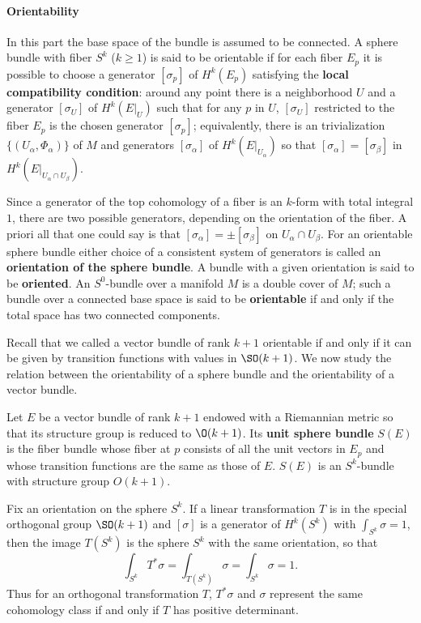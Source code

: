 \paragraph{Orientability}
In this part the base space of the bundle is assumed to be connected. A sphere bundle with fiber $S^k$ ($k\geq 1$) is said to be orientable if for each fiber $E_p$ it 
is possible to choose a generator $[\sigma_p]$ of $H^k(E_p)$ satisfying the \textbf{local compatibility condition}: around any point there is a neighborhood $U$ and a 
generator $[\sigma_U]$ of $H^k(E|_U)$ such that for any $p$ in $U$, $[\sigma_U]$ restricted to the fiber $E_p$ is the chosen generator $[\sigma_p]$; equivalently, 
there is an trivialization $\{(U_\alpha,\varPhi_\alpha)\}$ of $M$ and generators $[\sigma_\alpha]$ of $H^k(E|_{U_\alpha})$ so that $[\sigma_\alpha]=[\sigma_\beta]$ in 
$H^k(E|_{U_\alpha\cap U_\beta})$.\par
Since a generator of the top cohomology of a fiber is an $k$-form with total integral $1$, there are two possible generators, depending on the orientation of the fiber. 
A priori all that one could say is that $[\sigma_\alpha]=\pm[\sigma_\beta]$ on $U_\alpha\cap U_\beta$. For an orientable sphere bundle either choice of a consistent 
system of generators is called an \textbf{orientation of the sphere bundle}. A bundle with a given orientation is said to be \textbf{oriented}. An $S^0$-bundle over a 
manifold $M$ is a double cover of $M$; such a bundle over a connected base space is said to be \textbf{orientable} if and only if the total space has two connected 
components.\par
Recall that we called a vector bundle of rank $k+1$ orientable if and only if it can be given by transition functions with values in $\SO(k+1)$. We now study the 
relation between the orientability of a sphere bundle and the orientability of a vector bundle.\par
Let $E$ be a vector bundle of rank $k+1$ endowed with a Riemannian metric so that its structure group is reduced to $\O(k+1)$. Its \textbf{unit sphere bundle} $S(E)$ 
is the fiber bundle whose fiber at $p$ consists of all the unit vectors in $E_p$ and whose transition functions are the same as those of $E$. $S(E)$ is an $S^k$-bundle 
with structure group $O(k+1)$.
\begin{remark}
Fix an orientation on the sphere $S^k$. If a linear transformation $T$ is in the special orthogonal group $\SO(k+1)$ and $[\sigma]$ is a generator of $H^k(S^k)$ 
with $\int_{S^k}\sigma=1$, then the image $T(S^k)$ is the sphere $S^k$ with the same orientation, so that
\[\int_{S^k}T^*\sigma=\int_{T(S^k)}\sigma=\int_{S^k}\sigma=1.\]
Thus for an orthogonal transformation $T$, $T^*\sigma$ and $\sigma$ represent the same cohomology class if and only if $T$ has positive determinant.
\end{remark}
